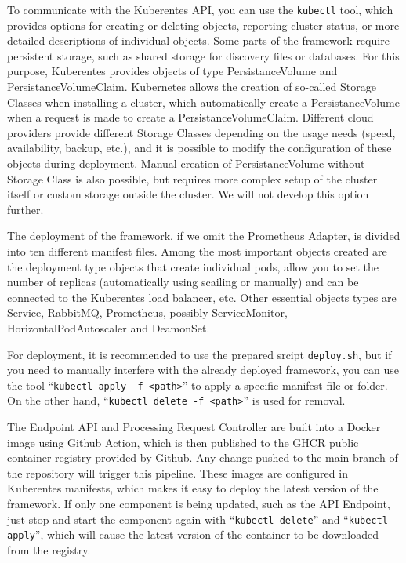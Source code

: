 To communicate with the Kuberentes API, you can use the \texttt{kubectl} tool, which provides options for creating or deleting objects, reporting cluster status, or more detailed descriptions of individual objects. Some parts of the framework require persistent storage, such as shared storage for discovery files or databases. For this purpose, Kuberentes provides objects of type PersistanceVolume and PersistanceVolumeClaim. Kubernetes allows the creation of so-called Storage Classes when installing a cluster, which automatically create a PersistanceVolume when a request is made to create a PersistanceVolumeClaim. Different cloud providers provide different Storage Classes depending on the usage needs (speed, availability, backup, etc.), and it is possible to modify the configuration of these objects during deployment. Manual creation of PersistanceVolume without Storage Class is also possible, but requires more complex setup of the cluster itself or custom storage outside the cluster. We will not develop this option further.

The deployment of the framework, if we omit the Prometheus Adapter, is divided into ten different manifest files.  Among the most important objects created are the deployment type objects that create individual pods, allow you to set the number of replicas (automatically using scailing or manually) and can be connected to the Kuberentes load balancer, etc. Other essential objects types are Service, RabbitMQ, Prometheus, possibly ServiceMonitor, HorizontalPodAutoscaler and DeamonSet.

For deployment, it is recommended to use the prepared srcipt \texttt{deploy.sh}, but if you need to manually interfere with the already deployed framework, you can use the tool “\texttt{kubectl apply -f <path>}” to apply a specific manifest file or folder. On the other hand,  “\texttt{kubectl delete -f <path>}” is used for removal.

The Endpoint API and Processing Request Controller are built into a Docker image using Github Action, which is then published to the GHCR public container registry provided by Github. Any change pushed to the main branch of the repository will trigger this pipeline. These images are configured in Kuberentes manifests, which makes it easy to deploy the latest version of the framework. If only one component is being updated, such as the API Endpoint, just stop and start the component again with “\texttt{kubectl delete}” and “\texttt{kubectl apply}”, which will cause the latest version of the container to be downloaded from the registry.

